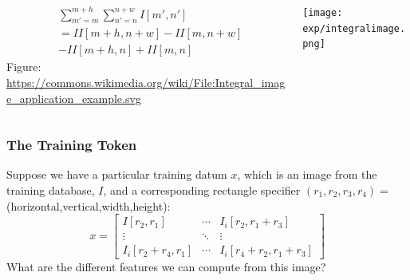 \documentclass{beamer}
\begin{document}
\begin{frame}
  \begin{columns}
    \begin{column}{0.5\textwidth}
      \begin{align*}
        &\sum_{m'=m}^{m+h}\sum_{n'=n}^{n+w}I[m',n']\\
        &= II[m+h,n+w]-II[m,n+w]\\
        &-II[m+h,n]+II[m,n]
      \end{align*}
      Figure: \url{https://commons.wikimedia.org/wiki/File:Integral_image_application_example.svg}
    \end{column}
    \begin{column}{0.5\textwidth}
      \centerline{\texttt{[image: exp/integralimage.png]}}
    \end{column}
  \end{columns}
\end{frame}

\begin{frame}
  \frametitle{The Training Token}

  Suppose we have a particular training datum $x$, which is an image
  from the training database, $I$, and a corresponding rectangle
  specifier $(r_1,r_2,r_3,r_4)=$(horizontal,vertical,width,height):
  \begin{displaymath}
    x=\left[\begin{array}{ccc}
        I[r_2,r_1]&\cdots&I_i[r_2,r_1+r_3]\\
        \vdots&\ddots&\vdots\\
        I_i[r_2+r_4,r_1]&\cdots&I_i[r_4+r_2,r_1+r_3]
      \end{array}\right]
  \end{displaymath}
  What are the different features we can compute from this image?
\end{frame}
\end{document}
